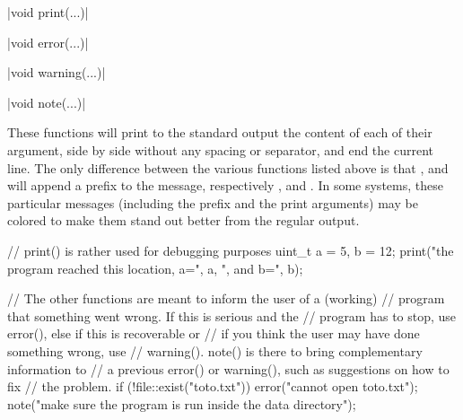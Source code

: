 \funcitem \cppinline|void print(...)| 

\cppinline|void error(...)| 

\cppinline|void warning(...)| 

\cppinline|void note(...)| 

These functions will print to the standard output the content of each of their argument, side by side without any spacing or separator, and end the current line. The only difference between the various functions listed above is that ,  and  will append a prefix to the message, respectively ,  and . In some systems, these particular messages (including the prefix and the print arguments) may be colored to make them stand out better from the regular  output.

\begin{example}
\begin{cppcode}
// print() is rather used for debugging purposes
uint_t a = 5, b = 12;
print("the program reached this location, a=", a, ", and b=", b);

// The other functions are meant to inform the user of a (working)
// program that something went wrong. If this is serious and the
// program has to stop, use error(), else if this is recoverable or
// if you think the user may have done something wrong, use
// warning(). note() is there to bring complementary information to
// a previous error() or warning(), such as suggestions on how to fix
// the problem.
if (!file::exist("toto.txt")) {
    error("cannot open toto.txt");
    note("make sure the program is run inside the data directory");
}
\end{cppcode}
\end{example}

